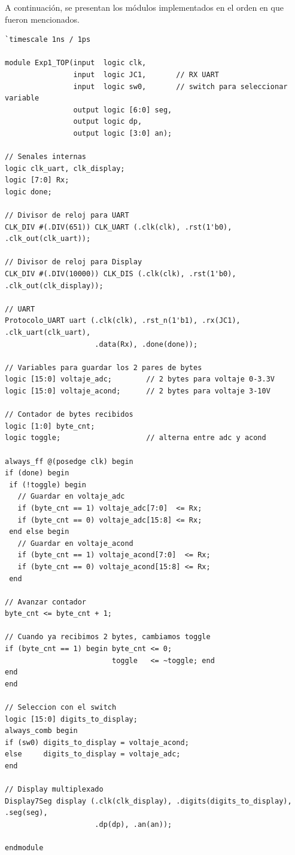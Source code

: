 \documentclass[letterpaper, 12pt]{article}
\begin{document}
A continuación, se presentan los módulos implementados en el orden en que fueron mencionados.
\begin{lstlisting}
`timescale 1ns / 1ps

module Exp1_TOP(input  logic clk,
                input  logic JC1,       // RX UART
                input  logic sw0,       // switch para seleccionar variable
                output logic [6:0] seg,
                output logic dp,
                output logic [3:0] an);

// Senales internas
logic clk_uart, clk_display;
logic [7:0] Rx;
logic done;

// Divisor de reloj para UART
CLK_DIV #(.DIV(651)) CLK_UART (.clk(clk), .rst(1'b0), .clk_out(clk_uart));

// Divisor de reloj para Display
CLK_DIV #(.DIV(10000)) CLK_DIS (.clk(clk), .rst(1'b0), .clk_out(clk_display));

// UART
Protocolo_UART uart (.clk(clk), .rst_n(1'b1), .rx(JC1), .clk_uart(clk_uart),
                     .data(Rx), .done(done));

// Variables para guardar los 2 pares de bytes
logic [15:0] voltaje_adc;        // 2 bytes para voltaje 0-3.3V
logic [15:0] voltaje_acond;      // 2 bytes para voltaje 3-10V

// Contador de bytes recibidos
logic [1:0] byte_cnt;
logic toggle;                    // alterna entre adc y acond

always_ff @(posedge clk) begin
if (done) begin 
 if (!toggle) begin
   // Guardar en voltaje_adc
   if (byte_cnt == 1) voltaje_adc[7:0]  <= Rx;
   if (byte_cnt == 0) voltaje_adc[15:8] <= Rx;
 end else begin
   // Guardar en voltaje_acond
   if (byte_cnt == 1) voltaje_acond[7:0]  <= Rx;
   if (byte_cnt == 0) voltaje_acond[15:8] <= Rx;
 end

// Avanzar contador
byte_cnt <= byte_cnt + 1;

// Cuando ya recibimos 2 bytes, cambiamos toggle
if (byte_cnt == 1) begin byte_cnt <= 0;
                         toggle   <= ~toggle; end
end
end

// Seleccion con el switch
logic [15:0] digits_to_display;
always_comb begin
if (sw0) digits_to_display = voltaje_acond;
else     digits_to_display = voltaje_adc;
end

// Display multiplexado
Display7Seg display (.clk(clk_display), .digits(digits_to_display), .seg(seg),
                     .dp(dp), .an(an));

endmodule
\end{lstlisting}
\end{document}
